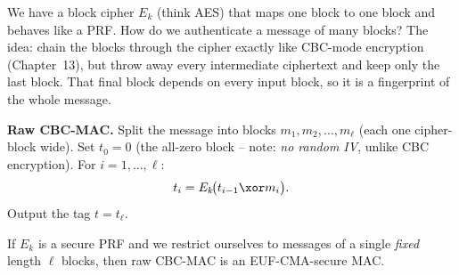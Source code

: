 We have a block cipher $E_k$ (think AES) that maps one block to one block and behaves like a PRF. How do we authenticate a message of many blocks? The idea: chain the blocks through the cipher exactly like CBC-mode encryption (Chapter~13), but throw away every intermediate ciphertext and keep only the last block. That final block depends on every input block, so it is a fingerprint of the whole message.

\begin{focusbox}
\textbf{Raw CBC-MAC.} Split the message into blocks $m_1,m_2,\dots,m_\ell$ (each one cipher-block wide). Set $t_0 = 0$ (the all-zero block -- note: \emph{no random IV}, unlike CBC encryption). For $i=1,\dots,\ell$:
\[
  t_i = E_k\!\big(t_{i-1}\xor m_i\big).
\]
Output the tag $t = t_\ell$.
\end{focusbox}

\begin{center}
\end{center}

\begin{theorem}
\label{ch15:cbcmac-thm}
If $E_k$ is a secure PRF and we restrict ourselves to messages of a single \emph{fixed} length $\ell$ blocks, then raw CBC-MAC is an EUF-CMA-secure MAC.
\end{theorem}

